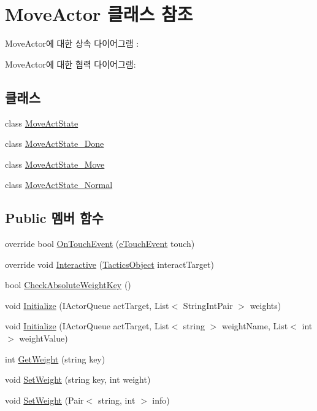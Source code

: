 \hypertarget{class_move_actor}{}\section{Move\+Actor 클래스 참조}
\label{class_move_actor}


Move\+Actor에 대한 상속 다이어그램 \+: 


Move\+Actor에 대한 협력 다이어그램\+:
\subsection*{클래스}
\begin{DoxyCompactItemize}
\item 
class \hyperlink{class_move_actor_1_1_move_act_state}{Move\+Act\+State}
\item 
class \hyperlink{class_move_actor_1_1_move_act_state___done}{Move\+Act\+State\+\_\+\+Done}
\item 
class \hyperlink{class_move_actor_1_1_move_act_state___move}{Move\+Act\+State\+\_\+\+Move}
\item 
class \hyperlink{class_move_actor_1_1_move_act_state___normal}{Move\+Act\+State\+\_\+\+Normal}
\end{DoxyCompactItemize}
\subsection*{Public 멤버 함수}
\begin{DoxyCompactItemize}
\item 
override bool \hyperlink{class_move_actor_abbb2fe6a87e45fe6a4f7eeec674558d6}{On\+Touch\+Event} (\hyperlink{_touch_manager_8cs_ae33e321a424fe84ba8b2fdb81ad40a68}{e\+Touch\+Event} touch)
\item 
override void \hyperlink{class_move_actor_ade9f1263ef53ad85968cf6cae50d6139}{Interactive} (\hyperlink{class_tactics_object}{Tactics\+Object} interact\+Target)
\item 
bool \hyperlink{class_f_z_1_1_actor_aa78fa8d765cfc56474c3714d38bcc13b}{Check\+Absolute\+Weight\+Key} ()
\item 
void \hyperlink{class_f_z_1_1_actor_ac29de02b4c3cc1012143f6531f5809ed}{Initialize} (I\+Actor\+Queue act\+Target, List$<$ String\+Int\+Pair $>$ weights)
\item 
void \hyperlink{class_f_z_1_1_actor_a968a8b42fa52f121bdcc9c8ea8136eb9}{Initialize} (I\+Actor\+Queue act\+Target, List$<$ string $>$ weight\+Name, List$<$ int $>$ weight\+Value)
\item 
int \hyperlink{class_f_z_1_1_actor_ab6dee08c1296f3c020694fd9408b7c33}{Get\+Weight} (string key)
\item 
void \hyperlink{class_f_z_1_1_actor_a0f36cb598cc81fc94bf5de590382004e}{Set\+Weight} (string key, int weight)
\item 
void \hyperlink{class_f_z_1_1_actor_a6c257b538187513e247b92905da53954}{Set\+Weight} (Pair$<$ string, int $>$ info)
\end{DoxyCompactItemize}
